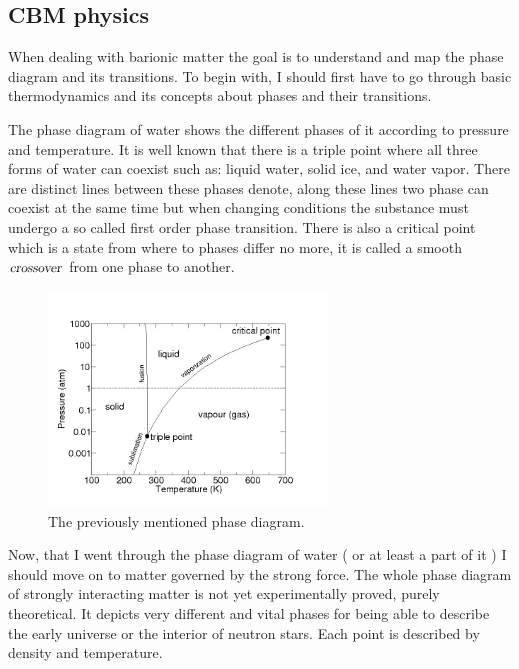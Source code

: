 \documentclass[a4paper,12pt]{article}
\begin{document}
\subsection{ CBM physics }
\vspace{5mm}
\par When dealing with barionic matter the goal is to understand and map the phase diagram and its transitions. To begin with, I should first have to go through basic thermodynamics and its concepts about phases and their transitions.
\vspace{5mm}
\par The phase diagram of water shows the different phases of it according to pressure and temperature. It is well known that there is a triple point where all three forms of water can coexist such as: liquid water,  solid ice, and water vapor. There are distinct lines between these phases denote, along these lines two phase can coexist at the same time but when changing conditions  the substance must undergo a so called first order phase transition. There is also a critical point which is a state from where to phases differ no more, it is called a smooth $\textsl{crossover}$ from one phase to another.
\begin{figure}[H]
\centering
\includegraphics[width=0.66\textwidth]{water_phase.jpg}
\caption{ The previously mentioned phase diagram. }
\end{figure}
\par Now, that I went through the phase diagram of water ( or at least a part of it ) I should move on to matter governed by the strong force. The whole phase diagram of strongly interacting matter is not yet experimentally proved, purely theoretical. It depicts very different and vital phases for being able to describe the early universe or the interior of neutron stars. Each point is described by density and temperature.
\end{document}
